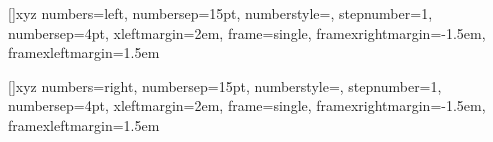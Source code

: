 	[]{xyz}
	{
		numbers=left,
		numbersep=15pt,
		numberstyle=\tiny,
		stepnumber=1,
		numbersep=4pt,
		xleftmargin=2em,
		frame=single,
		framexrightmargin=-1.5em,
		framexleftmargin=1.5em
	}
	
	[]{xyz}
	{
		numbers=right,
		numbersep=15pt,
		numberstyle=\tiny,
		stepnumber=1,
		numbersep=4pt,
		xleftmargin=2em,
		frame=single,
		framexrightmargin=-1.5em,
		framexleftmargin=1.5em
	}



\newcommand{\nnt}{{\sf T}^{\geq 0}}             %
\newcommand{\post}{{\sf T}^{>0}}                %
\newcommand{\Variables}{{\sf V}}                %

\newcommand{\num}[1]{\relax\ifmmode \mathbb #1\else $\mathbb #1$\fi}
\newcommand{\nnnum}[1]{\relax\ifmmode 
	{\mathbb #1}_{\geq 0} \else ${\mathbb #1}_{\geq 0}$
	\fi}
\newcommand{\npnum}[1]{\relax\ifmmode 
	{\mathbb #1}_{\leq 0} \else ${\mathbb #1}_{\leq 0}$
	\fi}
\newcommand{\pnum}[1]{\relax\ifmmode 
	{\mathbb #1}_{> 0} \else ${\mathbb #1}_{> 0}$
	\fi}
\newcommand{\nnum}[1]{\relax\ifmmode 
	{\mathbb #1}_{< 0} \else ${\mathbb #1}_{< 0}$
	\fi}
\newcommand{\plnum}[1]{\relax\ifmmode 
	{\mathbb #1}_{+} \else ${\mathbb #1}_{+}$
	\fi}
\newcommand{\nenum}[1]{\relax\ifmmode 
	{\mathbb #1}_{-} \else ${\mathbb #1}_{-}$
	\fi}
\newcommand{\K}{$\mathbb{K}\ $}
\newcommand{\reals}{{\num R}}                    %
\newcommand{\booleans}{{\num B}}                    %
\newcommand{\nnreals}{{\nnnum R}}                    %
\newcommand{\realsinfty}{{\num R} \cup \{\infty, -\infty\}}                    %
\newcommand{\plreals}{{\plnum R}}                    %
\newcommand{\naturals}{{\num N}}                      %
\newcommand{\integers}{{\num Z}}                      %
\newcommand{\rationals}{{\num Q}}                      %
\newcommand{\nnrationals}{{\nnnum Q}}                   %
\newcommand{\Time}{{\num T}}  





\newcommand{\NA}[1]{\textcolor{SubtleColor}{ {\tiny \bf ($\star$)} #1}}
\newcommand{\TODO}[1]{\textcolor{TODOColor}{ {\tiny \bf TODO:} #1}}
\newcommand{\LATER}[1]{\textcolor{SubtleColor}{ {\tiny \bf ($\dagger$)} #1}}
\newcommand{\TBD}[1]{\textcolor{SubtleColor}{ {\tiny \bf (!)} #1}}
\newcommand{\PROBLEM}[1]{\textcolor{WowColor}{ {\bf (!!)} {\bf #1}}}
\newcommand{\ST}[1]{ \textcolor{SubtleColor}{ {\tiny \bf (!!)} \sout{#1} } }

